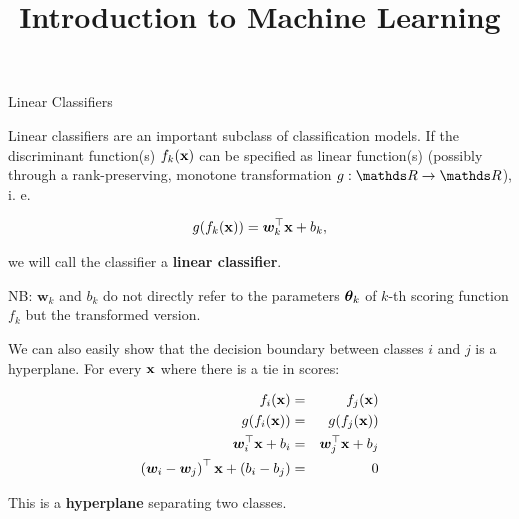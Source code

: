 \documentclass[11pt,compress,t,notes=noshow, xcolor=table]{beamer}
\title{Introduction to Machine Learning}
\institute{\href{https://compstat-lmu.github.io/lecture_i2ml/}{compstat-lmu.github.io/lecture\_i2ml}}
\date{}
\begin{document}
\framebreak


\begin{vbframe}{Linear Classifiers}

Linear classifiers are an important subclass of classification models.
If the discriminant function(s) $\fkx$ can be specified as linear function(s) (possibly through a rank-preserving,
monotone transformation $g: \R \to \R$), i. e.

$$
  g(\fkx) = \bm{w}_k^\top \xv + b_k,
$$

we will call the classifier a \textbf{linear classifier}.

\vfill

NB: $\bm{w}_k$ and $b_k$ do not directly refer to the parameters $\thetab_k$
of $k$-th scoring function $f_k$ but the transformed version.



\framebreak



We can also easily show that the decision boundary between classes $i$ and $j$ is a hyperplane. For every $\xv$ where there is a tie in scores:

\begin{eqnarray*}
  \fkx[i] &=& \fkx[j] \\
  g(\fkx[i]) &=& g(\fkx[j]) \\
  \bm{w}_i^\top \xv + b_i &=& \bm{w}_j^\top \xv + b_j \\
  \left(\bm{w}_i - \bm{w}_j\right)^\top \xv + \left(b_i - b_j\right) &=& 0
\end{eqnarray*}

This is a \textbf{hyperplane} separating two classes.




\end{vbframe}
\end{document}
